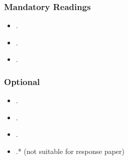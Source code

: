 \documentclass[abstract=on,parskip=full,headings=standardclasses,fontsize=11pt,paper=a4]{scrartcl}
\begin{document}
\subsubsection*{Mandatory Readings}
\begin{itemize}
\item {}.
\item {}.
\item {}.
\end{itemize}


\subsubsection*{Optional}
\begin{itemize}
\item {}.
\item {}.
\item {}.
\item {}.* (not suitable for response paper)
\end{itemize}



\end{document}
